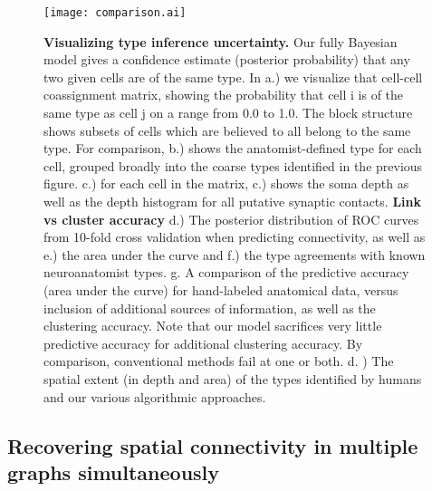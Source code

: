 \documentclass{article}
\begin{document}
\begin{figure}
  \centering 
  \centerline{\texttt{[image: comparison.ai]}}
  \caption{\textbf{Visualizing type inference uncertainty.} Our fully
    Bayesian model gives a confidence estimate (posterior probability)
    that any two given cells are of the same type. In a.) we visualize
    that cell-cell coassignment matrix, showing the probability that
    cell i is of the same type as cell j on a range from 0.0 to
    1.0. The block structure shows subsets of cells which are believed
    to all belong to the same type. For comparison, b.) shows the
    anatomist-defined type for each cell, grouped broadly into the
    coarse types identified in the previous figure. c.) for each cell
    in the matrix, c.) shows the soma depth as well as the depth
    histogram for all putative synaptic contacts. \textbf{Link vs
      cluster accuracy} d.) The posterior distribution of ROC curves
    from 10-fold cross validation when predicting connectivity, as
    well as e.) the area under the curve and f.) the type agreements
    with known neuroanatomist types. g. A comparison of the predictive
    accuracy (area under the curve) for hand-labeled anatomical data,
    versus inclusion of additional sources of information, as well as
    the clustering accuracy. Note that our model sacrifices very
    little predictive accuracy for additional clustering accuracy. By
    comparison, conventional methods fail at one or both.  d. ) The
    spatial extent (in depth and area) of the types identified by
    humans and our various algorithmic approaches.}
\label{fig:mouseretina_compare}
\end{figure}



\subsection*{Recovering spatial connectivity in multiple graphs simultaneously}
\end{document}
